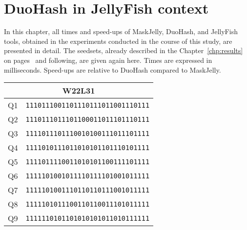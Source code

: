 \chapter{DuoHash in JellyFish context}
\label{chp:duohash-vs-maskjelly}


In this chapter, all times and speed-ups of MaskJelly, DuoHash, and JellyFish tools, obtained in the experiments conducted in the course of this study, are presented in detail. The seedsets, already described in the Chapter~\ref{chp:results} on pages~\pageref{subsec:seedset} and following, are given again here. Times are expressed in milliseconds. Speed-ups are relative to DuoHash compared to MaskJelly.

\begin{table}[!ht]
	\centering
	\begin{tabular}{l r}
		\multicolumn{2}{c}{W22L31} \\
		\toprule
		Q1 & \verb|1110111001101110111011001110111| \\
		Q2 & \verb|1110111011101100011011101110111| \\
		Q3 & \verb|1111011101110010100111011101111| \\
		Q4 & \verb|1111010111011010101101110101111| \\
		Q5 & \verb|1111011110011010101100111101111| \\
		Q6 & \verb|1111101001011110111101001011111| \\
		Q7 & \verb|1111101001110110110111001011111| \\
		Q8 & \verb|1111101011100110110011101011111| \\
		Q9 & \verb|1111110101101010101011010111111| \\
		\bottomrule
	\end{tabular}
\end{table}
\clearpage


